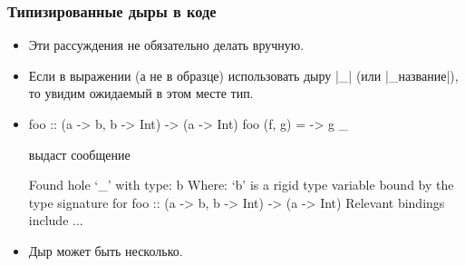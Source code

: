 \documentclass[10pt]{beamer}
\begin{document}
\begin{frame}[fragile]
  \frametitle{Типизированные дыры в коде}
  \begin{itemize}
    \item Эти рассуждения не обязательно делать вручную.
    \item Если в выражении (а не в образце) использовать дыру \haskinline|_| (или \haskinline|_название|), то увидим ожидаемый в этом месте тип.
    \item
          \begin{haskell}
            foo :: (a -> b, b -> Int) -> (a -> Int)
            foo (f, g) = \x -> g _
          \end{haskell}
          выдаст сообщение
          \begin{ghci}
            Found hole `_' with type: b
            Where: `b' is a rigid type variable bound by
            the type signature for foo :: (a -> b, b -> Int) -> (a -> Int)
            Relevant bindings include ...
          \end{ghci}
    \item Дыр может быть несколько.
  \end{itemize}
\end{frame}
\end{document}
